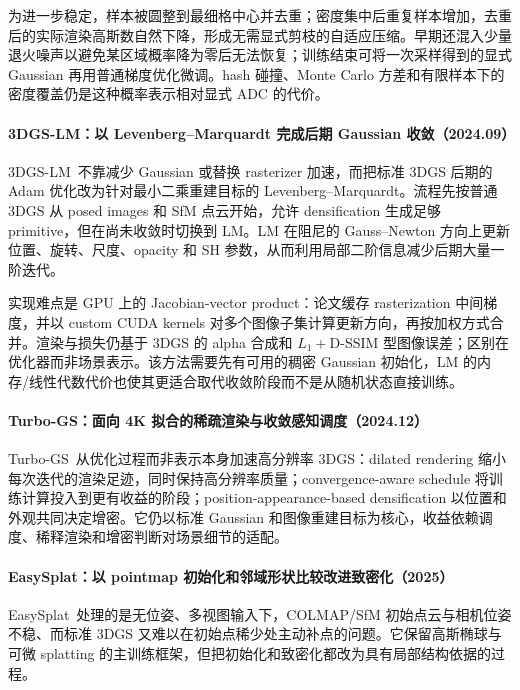 为进一步稳定，样本被圆整到最细格中心并去重；密度集中后重复样本增加，去重后的实际渲染高斯数自然下降，形成无需显式剪枝的自适应压缩。早期还混入少量退火噪声以避免某区域概率降为零后无法恢复；训练结束可将一次采样得到的显式 Gaussian 再用普通梯度优化微调。hash 碰撞、Monte Carlo 方差和有限样本下的密度覆盖仍是这种概率表示相对显式 ADC 的代价。

\paragraph{3DGS-LM：以 Levenberg--Marquardt 完成后期 Gaussian 收敛（2024.09）}
3DGS-LM~\cite{2409_12892}不靠减少 Gaussian 或替换 rasterizer 加速，而把标准 3DGS 后期的 Adam 优化改为针对最小二乘重建目标的 Levenberg--Marquardt。流程先按普通 3DGS 从 posed images 和 SfM 点云开始，允许 densification 生成足够 primitive，但在尚未收敛时切换到 LM。LM 在阻尼的 Gauss--Newton 方向上更新位置、旋转、尺度、opacity 和 SH 参数，从而利用局部二阶信息减少后期大量一阶迭代。

实现难点是 GPU 上的 Jacobian-vector product：论文缓存 rasterization 中间梯度，并以 custom CUDA kernels 对多个图像子集计算更新方向，再按加权方式合并。渲染与损失仍基于 3DGS 的 alpha 合成和 $L_1+$D-SSIM 型图像误差；区别在优化器而非场景表示。该方法需要先有可用的稠密 Gaussian 初始化，LM 的内存/线性代数代价也使其更适合取代收敛阶段而不是从随机状态直接训练。


\paragraph{Turbo-GS：面向 4K 拟合的稀疏渲染与收敛感知调度（2024.12）}
Turbo-GS~\cite{2412_13547}从优化过程而非表示本身加速高分辨率 3DGS：dilated rendering 缩小每次迭代的渲染足迹，同时保持高分辨率质量；convergence-aware schedule 将训练计算投入到更有收益的阶段；position-appearance-based densification 以位置和外观共同决定增密。它仍以标准 Gaussian 和图像重建目标为核心，收益依赖调度、稀释渲染和增密判断对场景细节的适配。


\paragraph{EasySplat：以 pointmap 初始化和邻域形状比较改进致密化（2025）\cite{2501_01003}}
EasySplat~\cite{2501_01003}处理的是无位姿、多视图输入下，COLMAP/SfM 初始点云与相机位姿不稳、而标准 3DGS 又难以在初始点稀少处主动补点的问题。它保留高斯椭球与可微 splatting 的主训练框架，但把初始化和致密化都改为具有局部结构依据的过程。

